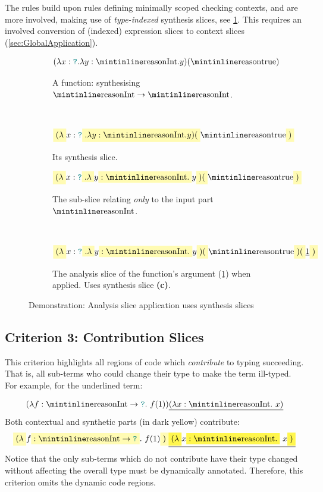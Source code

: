 The rules build upon rules defining minimally scoped checking contexts, and are more involved, making use of \textit{type-indexed} synthesis slices, see \cref{fig:AnalysisSliceApplication}. This requires an involved conversion of (indexed) expression slices to context slices (\cref{sec:GlobalApplication}).
\begin{figure}[h]
\centering
\begin{subfigure}{0.4\textwidth}
\[(\lambda x : \dyn. \lambda y : \code{Int}. y)(\code{true})\]
\caption{A function: synthesising $\code{Int} \to \code{Int}$.}
\end{subfigure}$\qquad$
\begin{subfigure}{0.4\textwidth}
\[\hlcmaths[yellow!30]{(\lambda} x : \dyn\hlcmaths[yellow!30]{. \lambda y : \code{Int}. y)(}\code{true}\hlcmaths[yellow!30]{)}\]
\caption{Its synthesis slice.}
\end{subfigure}
\begin{subfigure}{0.4\textwidth}
\[\hlcmaths[yellow!30]{(\lambda} x : \dyn\hlcmaths[yellow!30]{. \lambda} y \hlcmaths[yellow!30]{: \code{Int}.} y\hlcmaths[yellow!30]{)(}\code{true}\hlcmaths[yellow!30]{)}\]
\caption{The sub-slice relating \textit{only} to the input part $\code{Int}$.}
\end{subfigure}$\qquad$
\begin{subfigure}{0.4\textwidth}
\[\hlcmaths[yellow!30]{(\lambda} x : \dyn\hlcmaths[yellow!30]{. \lambda} y \hlcmaths[yellow!30]{: \code{Int}.} y\hlcmaths[yellow!30]{)(}\code{true}\hlcmaths[yellow!30]{)(}\underline{1}\hlcmaths[yellow!30]{)}\]
\caption{The analysis slice of the function's argument ($\underline{1}$) when applied. Uses synthesis slice \textbf{(c)}.}
\end{subfigure}
\caption{Demonstration: Analysis slice application uses synthesis slices}
\label{fig:AnalysisSliceApplication}
\end{figure}

\subsection{Criterion 3: Contribution Slices}
\label{sec:ContributionSlices}
This criterion highlights all regions of code which \textit{contribute} to typing succeeding. That is, all sub-terms who could change their type to make the term ill-typed. For example, for the underlined term:

\[(\lambda f: \code{Int} \to \dyn.\ f(1))\underline{(\lambda x : \code{Int}.\ x)}\]
Both contextual and synthetic parts (in dark yellow) contribute:
\[\hlcmaths[yellow!30]{(\lambda} f\hlcmaths[yellow!30]{: \code{Int} \to \dyn}.\ f(1)\hlcmaths[yellow!30]{)}\underline{\hlcmaths[yellow!70]{(\lambda} x \hlcmaths[yellow!70]{: \code{Int}.}\ x\hlcmaths[yellow!70]{)}}\]
Notice that the only sub-terms which do not contribute have their type changed without affecting the overall type must be dynamically annotated. Therefore, this criterion omits the dynamic code regions.

